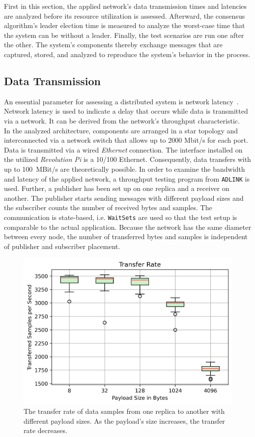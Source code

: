 First in this section, the applied network's data transmission times and latencies are analyzed before its resource utilization is assessed.
Afterward, the consensus algorithm's leader election time is measured to analyze the worst-case time that the system can be without a leader.
Finally, the test scenarios are run one after the other.
The system's components thereby exchange messages that are captured, stored, and analyzed to reproduce the system's behavior in the process.

\subsection{Data Transmission}

An essential parameter for assessing a distributed system is network latency~\cite{SinhaMeasureNetworkLatency}.
Network latency is used to indicate a delay that occurs while data is transmitted via a network.
It can be derived from the network's throughput characteristic.
\\

In the analyzed architecture, components are arranged in a star topology and interconnected via a network switch that allows up to 2000 Mbit/s for each port.
Data is transmitted via a wired \textit{Ethernet} connection.
The interface installed on the utilized \textit{Revolution Pi} is a 10/100 Ethernet.
Consequently, data transfers with up to 100~MBit/s are theoretically possible.
In order to examine the bandwidth and latency of the applied network, a  throughput testing program from \texttt{ADLINK} is used.
Further, a publisher has been set up on one replica and a receiver on another.
The publisher starts sending messages with different payload sizes and the subscriber counts the number of received bytes and samples.
The communication is state-based, i.e. \texttt{WaitSets} are used so that the test setup is comparable to the actual application.
Because the network has the same diameter between every node, the number of transferred bytes and samples is independent of publisher and subscriber placement.

\begin{figure}[!hbt]
	\centering
	\includegraphics[width=0.8\linewidth]{images/plots/transferRate}
	\caption{The transfer rate of data samples from one replica to another with different payload sizes. As the payload's size increases, the transfer rate decreases.}
	\label{fig:PlotTransferRate}
\end{figure}

